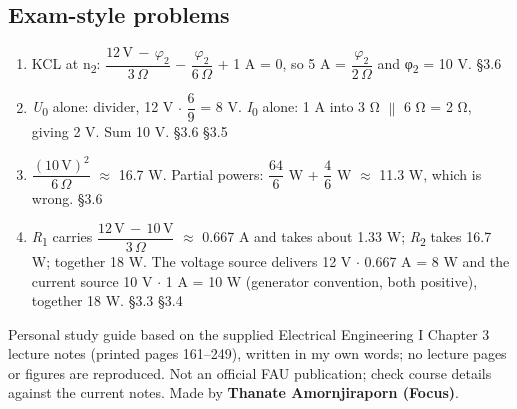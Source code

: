 \documentclass[11pt]{article}
\begin{document}
\begin{keepsection}\subsection{Exam-style problems}

\begin{enumerate}
\item KCL at n\textsubscript{2}: {\small\ensuremath{\dfrac{12\, \mathrm{V}\, -\, φ_{2}}{3\, Ω}}} \ensuremath{-} {\small\ensuremath{\dfrac{φ_{2}}{6\, Ω}}} + 1 A = 0, so 5 A = {\small\ensuremath{\dfrac{φ_{2}}{2\, Ω}}} and φ\textsubscript{2} = 10 V. \hfill{\small\color{FAUblue}§3.6}
\item \textit{U}\textsubscript{0} alone: divider, 12 V \ensuremath{\cdot} {\small\ensuremath{\dfrac{6}{9}}} = 8 V. \textit{I}\textsubscript{0} alone: 1 A into 3 Ω \ensuremath{\parallel} 6 Ω = 2 Ω, giving 2 V. Sum 10 V. \hfill{\small\color{FAUblue}§3.6} \hfill{\small\color{FAUblue}§3.5}
\item {\small\ensuremath{\dfrac{(10\, \mathrm{V})^{2}}{6\, Ω}}} \ensuremath{\approx} 16.7 W. Partial powers: {\small\ensuremath{\dfrac{64}{6}}} W + {\small\ensuremath{\dfrac{4}{6}}} W \ensuremath{\approx} 11.3 W, which is wrong. \hfill{\small\color{FAUblue}§3.6}
\item \textit{R}\textsubscript{1} carries {\small\ensuremath{\dfrac{12\, \mathrm{V}\, -\, 10\, \mathrm{V}}{3\, Ω}}} \ensuremath{\approx} 0.667 A and takes about 1.33 W; \textit{R}\textsubscript{2} takes 16.7 W; together 18 W. The voltage source delivers 12 V \ensuremath{\cdot} 0.667 A = 8 W and the current source 10 V \ensuremath{\cdot} 1 A = 10 W (generator convention, both positive), together 18 W. \hfill{\small\color{FAUblue}§3.3} \hfill{\small\color{FAUblue}§3.4}
\end{enumerate}

\end{keepsection}

\vfill{\small Personal study guide based on the supplied Electrical Engineering I Chapter 3 lecture notes (printed pages 161–249), written in my own words; no lecture pages or figures are reproduced. Not an official FAU publication; check course details against the current notes. Made by \textbf{Thanate Amornjiraporn (Focus)}.}
\end{document}
